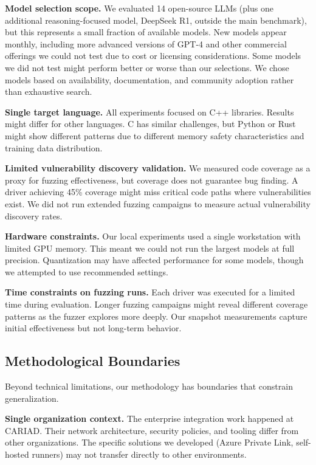 \textbf{Model selection scope.} We evaluated 14 open-source LLMs (plus one additional reasoning-focused model, DeepSeek R1, outside the main benchmark), but this represents a small fraction of available models. New models appear monthly, including more advanced versions of GPT-4 \cite{gpt4} and other commercial offerings we could not test due to cost or licensing considerations. Some models we did not test might perform better or worse than our selections. We chose models based on availability, documentation, and community adoption rather than exhaustive search.

\textbf{Single target language.} All experiments focused on C++ libraries. Results might differ for other languages. C has similar challenges, but Python or Rust might show different patterns due to different memory safety characteristics and training data distribution.

\textbf{Limited vulnerability discovery validation.} We measured code coverage as a proxy for fuzzing effectiveness, but coverage does not guarantee bug finding. A driver achieving 45\% coverage might miss critical code paths where vulnerabilities exist. We did not run extended fuzzing campaigns to measure actual vulnerability discovery rates.

\textbf{Hardware constraints.} Our local experiments used a single workstation with limited GPU memory. This meant we could not run the largest models at full precision. Quantization may have affected performance for some models, though we attempted to use recommended settings.

\textbf{Time constraints on fuzzing runs.} Each driver was executed for a limited time during evaluation. Longer fuzzing campaigns might reveal different coverage patterns as the fuzzer explores more deeply. Our snapshot measurements capture initial effectiveness but not long-term behavior.


\subsection{Methodological Boundaries}
\label{sec:discussion_methodology}

Beyond technical limitations, our methodology has boundaries that constrain generalization.

\textbf{Single organization context.} The enterprise integration work happened at CARIAD. Their network architecture, security policies, and tooling differ from other organizations. The specific solutions we developed (Azure Private Link, self-hosted runners) may not transfer directly to other environments.

